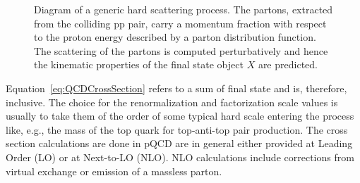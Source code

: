 
\begin{figure}[hbt]\begin{center}
        \myskip\myskip
	\caption{Diagram of a generic hard scattering process. The partons, extracted from the colliding pp pair,
  carry a momentum fraction with respect to the proton energy described by a parton distribution function. 
  The scattering of the partons is computed perturbatively and hence the kinematic properties of the final state object $X$ are predicted. \label{fig:hardscatter}}
\end{center}\end{figure}

Equation~\ref{eq:QCDCrossSection} refers to a sum of final state and is, therefore, inclusive. The choice for the 
renormalization and factorization scale values is usually to take them of the order of some typical hard scale 
entering the process like, e.g., the mass of the top quark for top-anti-top pair production.
The cross section calculations are done in pQCD are in general either provided at Leading Order (LO) 
or at Next-to-LO (NLO). NLO calculations include corrections from virtual exchange or emission of a massless parton.



